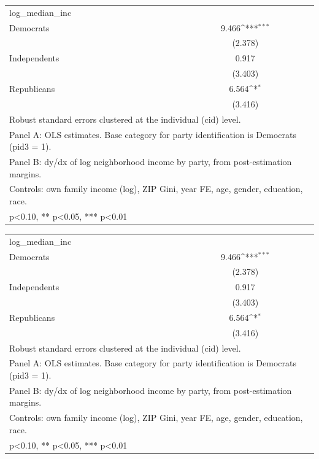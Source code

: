 {
\def\sym#1{\ifmmode^{#1}\else\(^{#1}\)\fi}
\begin{tabular}{l*{1}{c}}
\toprule
\midrule
log\_median\_inc&                     \\
Democrats   &       9.466\sym{***}\\
            &     (2.378)         \\
Independents&       0.917         \\
            &     (3.403)         \\
Republicans &       6.564\sym{*}  \\
            &     (3.416)         \\
\bottomrule
\multicolumn{2}{l}{\footnotesize Robust standard errors clustered at the individual (cid) level.}\\
\multicolumn{2}{l}{\footnotesize Panel A: OLS estimates. Base category for party identification is Democrats (pid3 = 1).}\\
\multicolumn{2}{l}{\footnotesize Panel B: dy/dx of log neighborhood income by party, from post-estimation margins.}\\
\multicolumn{2}{l}{\footnotesize Controls: own family income (log), ZIP Gini, year FE, age, gender, education, race.}\\
\multicolumn{2}{l}{\footnotesize * p<0.10, ** p<0.05, *** p<0.01}\\
\end{tabular}
}
{
\def\sym#1{\ifmmode^{#1}\else\(^{#1}\)\fi}
\begin{tabular}{l*{1}{c}}
\toprule
\midrule
log\_median\_inc&                     \\
Democrats   &       9.466\sym{***}\\
            &     (2.378)         \\
Independents&       0.917         \\
            &     (3.403)         \\
Republicans &       6.564\sym{*}  \\
            &     (3.416)         \\
\bottomrule
\multicolumn{2}{l}{\footnotesize Robust standard errors clustered at the individual (cid) level.}\\
\multicolumn{2}{l}{\footnotesize Panel A: OLS estimates. Base category for party identification is Democrats (pid3 = 1).}\\
\multicolumn{2}{l}{\footnotesize Panel B: dy/dx of log neighborhood income by party, from post-estimation margins.}\\
\multicolumn{2}{l}{\footnotesize Controls: own family income (log), ZIP Gini, year FE, age, gender, education, race.}\\
\multicolumn{2}{l}{\footnotesize * p<0.10, ** p<0.05, *** p<0.01}\\
\end{tabular}
}
